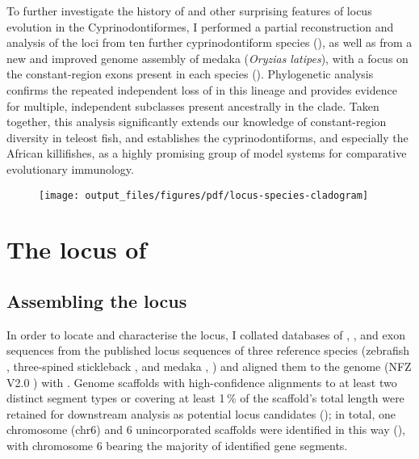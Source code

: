 To further investigate the history of  and other surprising features of \igh{} locus evolution in the Cyprinodontiformes, I performed a partial reconstruction and analysis of the \igh{} loci from ten further cyprinodontiform species (), as well as from a new and improved genome assembly of medaka (\textit{Oryzias latipes}), with a focus on the constant-region exons present in each species (). Phylogenetic analysis confirms the repeated independent loss of  in this lineage and provides evidence for multiple, independent  subclasses present ancestrally in the clade. Taken together, this analysis significantly extends our knowledge of constant-region diversity in teleost fish, and establishes the cyprinodontiforms, and especially the African killifishes, as a highly promising group of model systems for comparative evolutionary immunology.

\begin{figure}
	\centering
	\texttt{[image: output\_files/figures/pdf/locus-species-cladogram]}
	\label{fig:species-tree-large-taxa}
\end{figure}

\section{The \igh{} locus of \nfu}
\label{sec:nfu-locus}

\subsection{Assembling the \Nfu \igh{} locus}
\label{sec:nfu-locus-assembly}

In order to locate and characterise the \nfu \igh{} locus, I collated databases of \vh, \jh, and \ch exon sequences from the published locus sequences of three reference species (zebrafish \parencite{danilova2005zebrafish}, three-spined stickleback \parencite{bao2010stickleback,gambondeza2011stickleback}, and medaka \parencite{magadan2011medaka}, ) and aligned them to the \nfu genome (NFZ V2.0 \parencite{willemsen2019popgen}) with  \parencite{altschul1990blast,altschul1997blast}. Genome scaffolds with high-confidence alignments to at least two distinct segment types or covering at least 1\,\% of the scaffold's total length were retained for downstream analysis as potential locus candidates (); in total, one chromosome (chr6) and 6 unincorporated scaffolds were identified in this way (), with chromosome 6 bearing the majority of identified gene segments.

